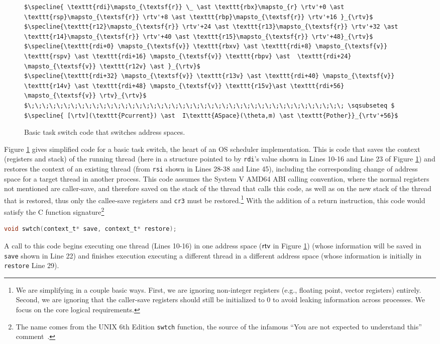 \documentclass[acmsmall,screen,nonacm]{acmart}
\begin{document}
\begin{figure}
\begin{lstlisting}
$\specline{ \texttt{rdi}\mapsto_{\textsf{r}} \_ \ast \texttt{rbx}\mapsto_{r} \rtv'+0 \ast  \texttt{rsp}\mapsto_{\textsf{r}} \rtv'+8 \ast \texttt{rbp}\mapsto_{\textsf{r}} \rtv'+16 }_{\rtv}$
$\specline{\texttt{r12}\mapsto_{\textsf{r}} \rtv'+24 \ast \texttt{r13}\mapsto_{\textsf{r}} \rtv'+32 \ast \texttt{r14}\mapsto_{\textsf{r}} \rtv'+40 \ast \texttt{r15}\mapsto_{\textsf{r}} \rtv'+48}_{\rtv}$
$\specline{\texttt{rdi+0} \mapsto_{\textsf{v}} \texttt{rbxv} \ast \texttt{rdi+8} \mapsto_{\textsf{v}} \texttt{rspv} \ast \texttt{rdi+16} \mapsto_{\textsf{v}} \texttt{rbpv} \ast  \texttt{rdi+24} \mapsto_{\textsf{v}} \texttt{r12v} \ast }_{\rtv}$
$\specline{\texttt{rdi+32} \mapsto_{\textsf{v}} \texttt{r13v} \ast \texttt{rdi+40} \mapsto_{\textsf{v}} \texttt{r14v} \ast \texttt{rdi+48} \mapsto_{\textsf{v}} \texttt{r15v}\ast \texttt{rdi+56} \mapsto_{\textsf{v}} \rtv}_{\rtv}$
$\;\;\;\;\;\;\;\;\;\;\;\;\;\;\;\;\;\;\;\;\;\;\;\;\;\;\;\;\;\;\;\;\;\;\;\;\;\;\;\;\;\;\;\; \sqsubseteq $
$\specline{ [\rtv](\texttt{Pcurrent}) \ast  I\texttt{ASpace}(\theta,m) \ast \texttt{Pother}}_{\rtv'+56}$
\end{lstlisting}
\caption{Basic task switch code that switches address spaces.}
\label{fig:swtch}
\end{figure}

Figure \ref{fig:swtch} gives simplified code for a basic task switch, the heart of an OS scheduler implementation. This is code that saves the context (registers and stack) of the running thread (here in a structure pointed to by \lstinline|rdi|'s value shown in Lines 10-16 and Line 23 of Figure \ref{fig:swtch}) and restores the context of an existing thread (from \lstinline|rsi| shown in Lines 28-38 and Line 45), including the corresponding change of address space for a target thread in another process.
This code assumes the System V AMD64 ABI calling convention, where the normal registers not mentioned are caller-save, and therefore saved on the stack of the thread that calls this code, as well as on the new stack of the thread that is restored, thus only the callee-save registers and \texttt{cr3} must be restored.\footnote{We are simplifying in a couple basic ways. First, we are ignoring non-integer registers (e.g., floating point, vector registers) entirely. Second, we are ignoring that the caller-save registers should still be initialized to 0 to avoid leaking information across processes. We focus on the core logical requirements.}
With the addition of a return instruction, this code would satisfy the C function signature\footnote{The name comes from the UNIX 6th Edition \lstinline|swtch| function, the source of the infamous ``You are not expected to understand this'' comment~\cite{lions1996lions}.}
\begin{lstlisting}[language=C]
void swtch(context_t* save, context_t* restore);
\end{lstlisting}
A call to this code begins executing one thread (Lines 10-16) in one address space ($\textsf{rtv}$ in Figure \ref{fig:swtch}) (whose information will be saved in \lstinline[language=C]|save| shown in Line 22) and finishes execution executing a different thread in a different address space (whose information is initially in \lstinline[language=C]|restore| Line 29).
\end{document}
